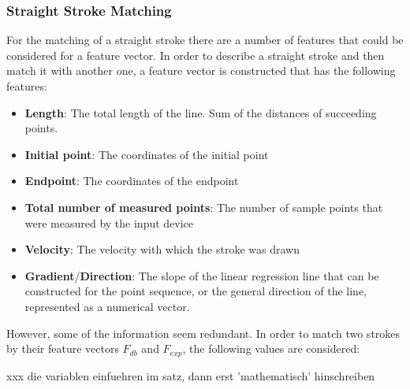 \subsubsection{Straight Stroke Matching}
\label{sec:hwre:straightstrokematching}

For the matching of a straight stroke there are a number of features
that could be considered for a feature vector.
In order to describe a straight stroke and then match it with another one,
a feature vector is constructed that has the following features:
\begin{itemize}
  \item \textbf{Length}: The total length of the line. Sum of the distances of
        succeeding points.
  \item \textbf{Initial point}: The coordinates of the initial point
  \item \textbf{Endpoint}: The coordinates of the endpoint
  \item \textbf \textbf{Total number of measured points}: The number of sample
        points that were measured by the input device
  \item \textbf{Velocity}: The velocity with which the stroke was drawn
  \item \textbf{Gradient}/\textbf{Direction}: The slope of the linear 
  regression line that can be constructed for the point sequence, or
  the general direction of the line, represented as a numerical vector.
\end{itemize}
However, some of the information seem redundant.
In order to match two strokes by their feature vectors \(F_{db} \) 
and \(F_{exp} \), the following values are considered:

xxx die variablen einfuehren im satz, dann erst 'mathematisch' hinschreiben

